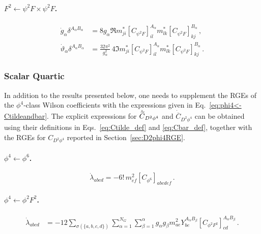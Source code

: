 \paragraph{$F^2\leftarrow \psi^2 F \times \psi^2 F$.}
\begin{align}
    \dot g_\alpha \delta^{A_\alpha B_\alpha} &= 8g_\alpha \Re{m^*_{ji} \left[C_{\psi^2 F}\right]_{il}^{A_\alpha} m^*_{lk} \left[C_{\psi^2 F}\right]_{kj}^{B_\alpha}} \,,\label{gauge_psi2Fxpsi2F}
    \\
    \dot \vartheta_\alpha \delta^{A_\alpha B_\alpha} &= \frac{32\pi^2}{g_\alpha^2}\,4\Im{m^*_{ji} \left[C_{\psi^2 F}\right]_{il}^{A_\alpha} m^*_{lk} \left[C_{\psi^2 F}\right]_{kj}^{B_\alpha}} \,.\label{theta_psi2Fxpsi2F}
\end{align}



\subsubsection{Scalar Quartic}

In addition to the results presented below, one needs to supplement the RGEs of the $\phi^4$-class Wilson coefficients with the expressions given in Eq.~\eqref{eq:phi4<-Ctildeandbar}.
The explicit expressions for $\dot{\widetilde{C}}_{D^2\phi^4}$ and $\dot{\overline C}_{D^2\phi^4}$ can be obtained using their definitions in Eqs.~\eqref{eq:Ctilde_def} and \eqref{eq:Cbar_def}, together with the RGEs for $C_{D^2\phi^4}$ reported in Section~\ref{sec:D2phi4RGE}.

\paragraph{\texorpdfstring{$\phi^{4} \leftarrow \phi^6$}{phi4fromphi6}.}

\begin{equation}
    \dot \lambda_{abcd} = -6!\,m^2_{ef}\left[C_{\phi^6}\right]_{abcdef}\,.
    \label{eq:lambda_CH6}
\end{equation}

\paragraph{\texorpdfstring{$\phi^{4} \leftarrow \phi^2 F^2$}{phi4fromphi2F2}.}

\begin{align}
    \dot \lambda_{abcd} &= -12 \sum_{\sigma(\{a,b,c,d\})} \sum_{\alpha=1}^{N_G} \sum_{\beta=1}^{\alpha} g_\alpha g_\beta m^2_{ae} Y^{A_\alpha B_\beta}_{be} \left[C_{\phi^2 F^2}\right]^{A_\alpha B_\beta}_{cd}\,.
    \label{eq:phi2F2_to_phi4}
\end{align}

